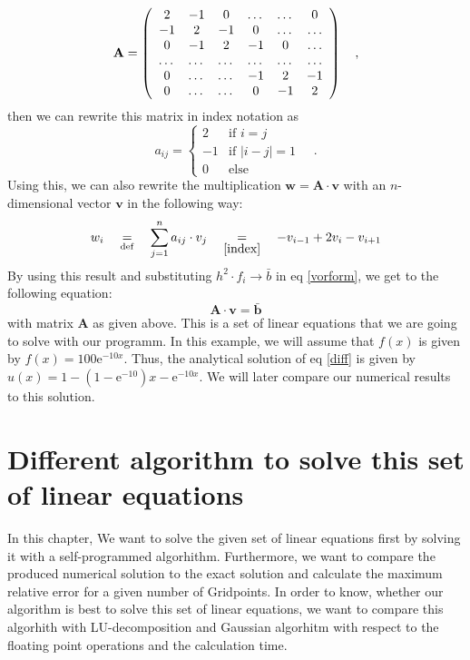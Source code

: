 \documentclass[10pt,a4paper]{article}
\begin{document}
\begin{equation}
{\bf A} = \left(\begin{array}{cccccc}
2& -1& 0 &\dots   & \dots &0 \\
-1 & 2 & -1 &0 &\dots &\dots \\
0&-1 &2 & -1 & 0 & \dots \\\dots
& \dots   & \dots &\dots   &\dots & \dots \\
0&\dots   &\dots  &-1 &2& -1 \\
0&\dots    &\dots  & 0  &-1 & 2 \\
\end{array} \right)\quad,
\end{equation}
then we can rewrite this matrix in index notation as
\begin{equation}
\label{index}
	a_{ij}=\begin{cases}
		2&\mbox{if }i=j\\
		-1&\mbox{if  }|i-j|=1\\
		0&\mbox{else}
	\end{cases}\quad.
\end{equation}
Using this, we can also rewrite the multiplication $\mathbf{w}=\mathbf{A}\cdot\mathbf{v}$ with an $n$-dimensional vector $\mathbf v$ in the following way:
\begin{equation}
	w_i\quad\underset{\mathrm{def}}{=}\quad\sum_{j=1}^{n}a_{ij}\cdot v_j\quad\underset{\eqref{index}}{=}\quad -v_{i-1}+2v_i-v_{i+1}
\end{equation}
By using this result and substituting $h^2\cdot f_i\rightarrow\bar{b}$ in eq \eqref{vorform}, we get to the following equation:
\begin{equation}
	\mathbf{A \cdot v}=\bar{\mathbf{b}}
\end{equation}
with matrix $\mathbf{A}$ as given above. This is a set of linear equations that we are going to solve with our programm. In this example, we will assume that $f(x)$ is given by $f(x)=100\mathrm{e}^{-10x}$. Thus, the analytical solution of eq \eqref{diff} is given by $u(x)=1-(1-\mathrm{e}^{-10})x-\mathrm{e}^{-10x}$. We will later compare our numerical results to this solution.

\section{Different algorithm to solve this set of linear equations}

In this chapter, We want to solve the given set of linear equations first by solving it with a self-programmed algorhithm. Furthermore, we want to compare the produced numerical solution to the exact solution and calculate the maximum relative error for a given number of Gridpoints. 
In order to know, whether our algorithm is best to solve this set of linear equations, we want to compare this algorhith with LU-decomposition and Gaussian algorhitm with respect to the floating point operations and the calculation time. 
\end{document}
